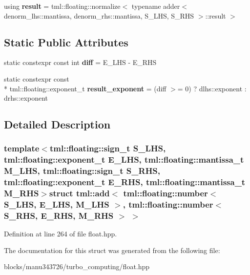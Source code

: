 \begin{DoxyCompactItemize}
\item 
\hypertarget{structtml_1_1add_3_01tml_1_1floating_1_1number_3_01_s___l_h_s_00_01_e___l_h_s_00_01_m___l_h_s_01f5ea122b4a29987e9df4655966e7e279_afdf0f364a6ec33338a7dc9c8108d6f5e}{using {\bfseries result} = tml\+::floating\+::normalize$<$ typename adder$<$ denorm\+\_\+lhs\+::mantissa, denorm\+\_\+rhs\+::mantissa, S\+\_\+\+L\+H\+S, S\+\_\+\+R\+H\+S $>$\+::result $>$}\label{structtml_1_1add_3_01tml_1_1floating_1_1number_3_01_s___l_h_s_00_01_e___l_h_s_00_01_m___l_h_s_01f5ea122b4a29987e9df4655966e7e279_afdf0f364a6ec33338a7dc9c8108d6f5e}

\end{DoxyCompactItemize}
\subsection*{Static Public Attributes}
\begin{DoxyCompactItemize}
\item 
\hypertarget{structtml_1_1add_3_01tml_1_1floating_1_1number_3_01_s___l_h_s_00_01_e___l_h_s_00_01_m___l_h_s_01f5ea122b4a29987e9df4655966e7e279_ab5fd3078a0d43e47fc06fe98e0aa590e}{static constexpr const int {\bfseries diff} = E\+\_\+\+L\+H\+S -\/ E\+\_\+\+R\+H\+S}\label{structtml_1_1add_3_01tml_1_1floating_1_1number_3_01_s___l_h_s_00_01_e___l_h_s_00_01_m___l_h_s_01f5ea122b4a29987e9df4655966e7e279_ab5fd3078a0d43e47fc06fe98e0aa590e}

\item 
\hypertarget{structtml_1_1add_3_01tml_1_1floating_1_1number_3_01_s___l_h_s_00_01_e___l_h_s_00_01_m___l_h_s_01f5ea122b4a29987e9df4655966e7e279_a4658ccdf34fb34cf88bb1a62048e903b}{static constexpr const \\*
tml\+::floating\+::exponent\+\_\+t {\bfseries result\+\_\+exponent} = (diff $>$= 0) ? dlhs\+::exponent \+: drhs\+::exponent}\label{structtml_1_1add_3_01tml_1_1floating_1_1number_3_01_s___l_h_s_00_01_e___l_h_s_00_01_m___l_h_s_01f5ea122b4a29987e9df4655966e7e279_a4658ccdf34fb34cf88bb1a62048e903b}

\end{DoxyCompactItemize}


\subsection{Detailed Description}
\subsubsection*{template$<$tml\+::floating\+::sign\+\_\+t S\+\_\+\+L\+H\+S, tml\+::floating\+::exponent\+\_\+t E\+\_\+\+L\+H\+S, tml\+::floating\+::mantissa\+\_\+t M\+\_\+\+L\+H\+S, tml\+::floating\+::sign\+\_\+t S\+\_\+\+R\+H\+S, tml\+::floating\+::exponent\+\_\+t E\+\_\+\+R\+H\+S, tml\+::floating\+::mantissa\+\_\+t M\+\_\+\+R\+H\+S$>$struct tml\+::add$<$ tml\+::floating\+::number$<$ S\+\_\+\+L\+H\+S, E\+\_\+\+L\+H\+S, M\+\_\+\+L\+H\+S $>$, tml\+::floating\+::number$<$ S\+\_\+\+R\+H\+S, E\+\_\+\+R\+H\+S, M\+\_\+\+R\+H\+S $>$ $>$}



Definition at line 264 of file float.\+hpp.



The documentation for this struct was generated from the following file\+:\begin{DoxyCompactItemize}
\item 
blocks/manu343726/turbo\+\_\+computing/float.\+hpp\end{DoxyCompactItemize}
